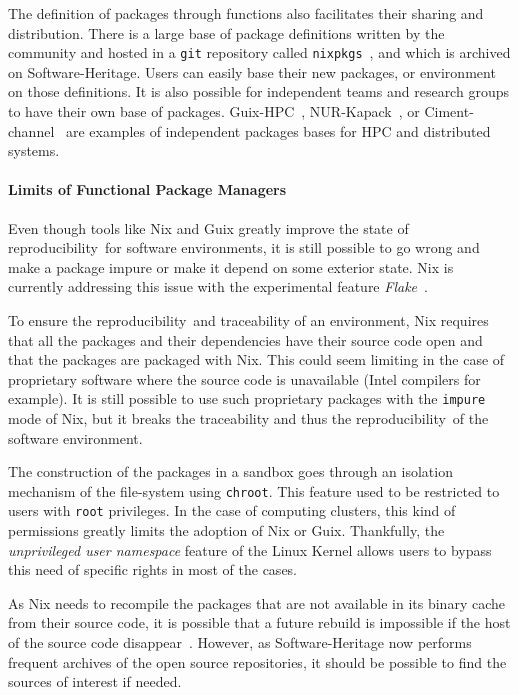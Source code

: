 \documentclass[sigconf,natbib=false]{acmart}
\newcommand{\repro}{reproducibility}
\begin{document}
The definition of packages through functions also facilitates their sharing and distribution.
There is a large base of package definitions written by the community and hosted in a \texttt{git} repository called \texttt{nixpkgs}\ \cite{nixpkgs}, and which is archived on Software-Heritage.
Users can easily base their new packages, or environment on those definitions.
It is also possible for independent teams and research groups to have their own base of packages.
Guix-HPC\ \cite{guix-hpc}, NUR-Kapack\ \cite{kapack}, or Ciment-channel\ \cite{ciment_channel} are examples of independent packages bases for HPC and distributed systems.

\paragraph{Limits of Functional Package Managers}

Even though tools like Nix and Guix greatly improve the state of \repro\ for software environments, it is still possible to go wrong and make a package impure or make it depend on some exterior state.
Nix is currently addressing this issue with the experimental feature \emph{Flake}\ \cite{flakes}.

To ensure the \repro\ and traceability of an environment, Nix requires that all the packages and their dependencies have their source code open and that the packages are packaged with Nix.
This could seem limiting in the case of proprietary software where the source code is unavailable (Intel compilers for example).
It is still possible to use such proprietary packages with the \texttt{impure} mode of Nix, but it breaks the traceability and thus the \repro\ of the software environment. 

The construction of the packages in a sandbox goes through an isolation mechanism of the file-system using \texttt{chroot}.
This feature used to be restricted to users with \texttt{root} privileges.
In the case of computing clusters, this kind of permissions greatly limits the adoption of Nix or Guix.
Thankfully, the \emph{unprivileged user namespace} feature of the Linux Kernel allows users to bypass this need of specific rights in most of the cases.

As Nix needs to recompile the packages that are not available in its binary cache from their source code, it is possible that a future rebuild is impossible if the host of the source code disappear\ \cite{blinry}.
However, as Software-Heritage now performs frequent archives of the open source repositories, it should be possible to find the sources of interest if needed.
\end{document}
